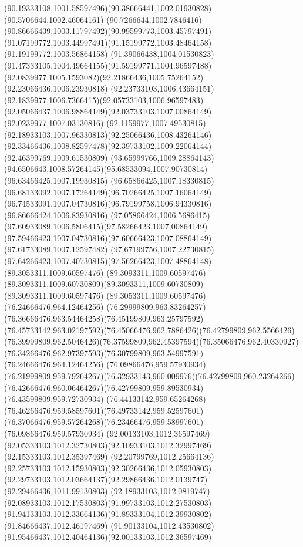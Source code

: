 {{	\curveto(90.19333108,1001.58597496)(90.38666441,1002.01930828)(90.5706644,1002.46064161)
	\curveto(90.7266644,1002.7846416)(90.86666439,1003.11797492)(90.99599773,1003.45797491)
	\curveto(91.07199772,1003.44997491)(91.15199772,1003.48464158)(91.19199772,1003.56864158)
	\curveto(91.39066438,1004.01530823)(91.47333105,1004.49664155)(91.59199771,1004.96597488)
	\curveto(92.0839977,1005.1593082)(92.21866436,1005.75264152)(92.23066436,1006.23930818)
	\curveto(92.23733103,1006.43664151)(92.1839977,1006.7366415)(92.05733103,1006.96597483)
	\curveto(92.05066437,1006.98864149)(92.03733103,1007.00864149)(92.0239977,1007.03130816)
	\curveto(92.1159977,1007.49530815)(92.18933103,1007.96330813)(92.25066436,1008.43264146)
	\curveto(92.33466436,1008.82597478)(92.39733102,1009.22064144)(92.46399769,1009.61530809)
	\lineto(93.65999766,1009.28864143)
	\curveto(94.6506643,1008.57264145)(95.68533094,1007.90730814)(96.63466425,1007.19930815)
	\curveto(96.65866425,1007.18330815)(96.68133092,1007.17264149)(96.70266425,1007.16064149)
	\curveto(96.74533091,1007.04730816)(96.79199758,1006.94330816)(96.86666424,1006.83930816)
	\curveto(97.05866424,1006.5686415)(97.60933089,1006.5806415)(97.58266423,1007.00864149)
	\curveto(97.59466423,1007.04730816)(97.60666423,1007.08864149)(97.61733089,1007.12597482)
	\curveto(97.67199756,1007.22730815)(97.64266423,1007.40730815)(97.56266423,1007.48864148)
	\moveto(89.3053311,1009.60597476)
	\curveto(89.3093311,1009.60597476)(89.3093311,1009.60730809)(89.3093311,1009.60730809)
	\lineto(89.3093311,1009.60597476)
	\lineto(89.3053311,1009.60597476)
	\moveto(76.24666476,964.12464256)
	\curveto(76.29999809,963.83264257)(76.36666476,963.54464258)(76.45199809,963.25797592)
	\curveto(76.45733142,963.02197592)(76.45066476,962.7886426)(76.42799809,962.5566426)
	\curveto(76.39999809,962.5046426)(76.37599809,962.45397594)(76.35066476,962.40330927)
	\curveto(76.34266476,962.97397593)(76.30799809,963.54997591)(76.24666476,964.12464256)
	\moveto(76.09866476,959.57930934)
	\curveto(76.21999809,959.79264267)(76.32933143,960.009976)(76.42799809,960.23264266)
	\curveto(76.42666476,960.06464267)(76.42799809,959.89530934)(76.43599809,959.72730934)
	\curveto(76.44133142,959.65264268)(76.46266476,959.58597601)(76.49733142,959.52597601)
	\curveto(76.37066476,959.57264268)(76.23466476,959.58997601)(76.09866476,959.57930934)
	\moveto(92.00133103,1012.36597469)
	\curveto(92.05333103,1012.32730803)(92.10933103,1012.32997469)(92.15333103,1012.35397469)
	\curveto(92.20799769,1012.25664136)(92.25733103,1012.15930803)(92.30266436,1012.05930803)
	\curveto(92.29733103,1012.03664137)(92.29866436,1012.0139747)(92.29466436,1011.99130803)
	\curveto(92.18933103,1012.0819747)(92.08933103,1012.17530803)(91.99733103,1012.27530803)
	\curveto(91.94133103,1012.33664136)(91.89333104,1012.39930802)(91.84666437,1012.46197469)
	\curveto(91.90133104,1012.43530802)(91.95466437,1012.40464136)(92.00133103,1012.36597469)
}
}
